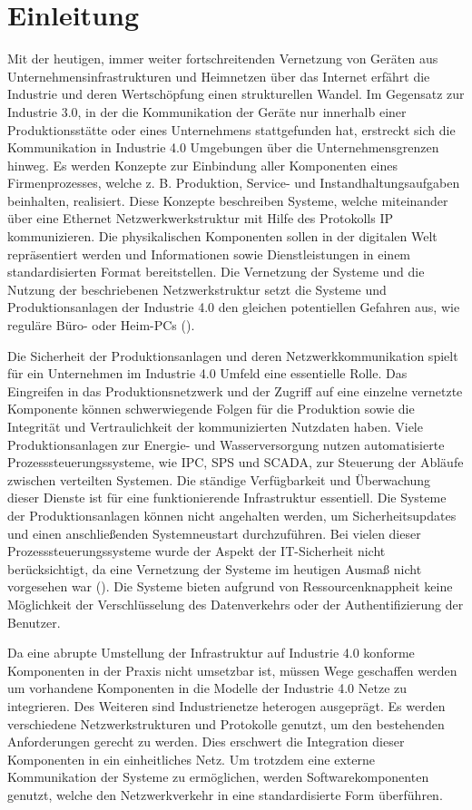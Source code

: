 \chapter{Einleitung}
Mit der heutigen, immer weiter fortschreitenden Vernetzung von Geräten aus Unternehmensinfrastrukturen und Heimnetzen über das Internet erfährt die Industrie und deren Wertschöpfung einen strukturellen Wandel. Im Gegensatz zur Industrie 3.0, in der die Kommunikation der Geräte nur innerhalb einer Produktionsstätte oder eines Unternehmens stattgefunden hat, erstreckt sich die Kommunikation in Industrie 4.0 Umgebungen über die Unternehmensgrenzen hinweg. Es werden Konzepte zur Einbindung aller Komponenten eines Firmenprozesses, welche z. B. Produktion, Service- und Instandhaltungsaufgaben beinhalten, realisiert. Diese Konzepte beschreiben Systeme, welche miteinander über eine Ethernet Netzwerkwerkstruktur mit Hilfe des Protokolls \ac{IP} kommunizieren. Die physikalischen Komponenten sollen in der digitalen Welt repräsentiert werden und Informationen sowie Dienstleistungen in einem standardisierten Format bereitstellen. Die Vernetzung der Systeme und die Nutzung der beschriebenen Netzwerkstruktur setzt die Systeme und Produktionsanlagen der Industrie 4.0 den gleichen potentiellen Gefahren aus, wie reguläre Büro- oder Heim-PCs (\cite{Halang2016}).

Die Sicherheit der Produktionsanlagen und deren Netzwerkkommunikation spielt für ein Unternehmen im Industrie 4.0 Umfeld eine essentielle Rolle. Das Eingreifen in das Produktionsnetzwerk und der Zugriff auf eine einzelne vernetzte Komponente können schwerwiegende Folgen für die Produktion sowie die Integrität und Vertraulichkeit der kommunizierten Nutzdaten haben. Viele Produktionsanlagen zur Energie- und Wasserversorgung nutzen automatisierte Prozesssteuerungssysteme, wie \ac{IPC}, \ac{SPS} und \ac{SCADA}, zur Steuerung der Abläufe zwischen verteilten Systemen. Die ständige Verfügbarkeit und Überwachung dieser Dienste ist für eine funktionierende Infrastruktur essentiell. Die Systeme der Produktionsanlagen können nicht angehalten werden, um Sicherheitsupdates und einen anschließenden Systemneustart durchzuführen. Bei vielen dieser Prozesssteuerungssysteme wurde der Aspekt der IT-Sicherheit nicht berücksichtigt, da eine Vernetzung der Systeme im heutigen Ausmaß nicht vorgesehen war (\cite{Schleupner2016}). Die Systeme bieten aufgrund von Ressourcenknappheit keine Möglichkeit der Verschlüsselung des Datenverkehrs oder der Authentifizierung der Benutzer.

Da eine abrupte Umstellung der Infrastruktur auf Industrie 4.0 konforme Komponenten in der Praxis nicht umsetzbar ist, müssen Wege geschaffen werden um vorhandene Komponenten in die Modelle der Industrie 4.0 Netze zu integrieren. Des Weiteren sind Industrienetze heterogen ausgeprägt. Es werden verschiedene Netzwerkstrukturen und Protokolle genutzt, um den bestehenden Anforderungen gerecht zu werden. Dies erschwert die Integration dieser Komponenten in ein einheitliches Netz. Um trotzdem eine externe Kommunikation der Systeme zu ermöglichen, werden Softwarekomponenten genutzt, welche den Netzwerkverkehr in eine standardisierte Form überführen.

